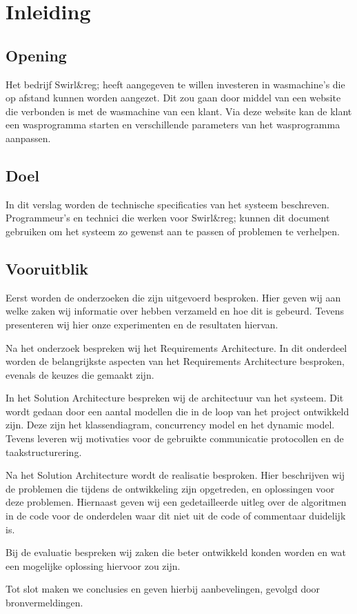 \chapter{Inleiding}
\newpage

\section{Opening}
Het bedrijf Swirl&reg; heeft aangegeven te willen investeren in wasmachine's die op afstand kunnen worden aangezet.
Dit zou gaan door middel van een website die verbonden is met de wasmachine van een klant. Via deze website kan de klant een wasprogramma starten en verschillende parameters van het wasprogramma aanpassen.

\section{Doel}
In dit verslag worden de technische specificaties van het systeem beschreven.
Programmeur's en technici die werken voor Swirl&reg; kunnen dit document gebruiken om het systeem zo gewenst aan te passen of problemen te verhelpen.

\section{Vooruitblik}
Eerst worden de onderzoeken die zijn uitgevoerd besproken.
Hier geven wij aan welke zaken wij informatie over hebben verzameld en hoe dit is gebeurd. Tevens presenteren wij hier onze experimenten en de resultaten hiervan.

Na het onderzoek bespreken wij het Requirements Architecture. In dit onderdeel worden de belangrijkste aspecten van het Requirements Architecture besproken, evenals de keuzes die gemaakt zijn.

In het Solution Architecture bespreken wij de architectuur van het systeem. Dit wordt gedaan door een aantal modellen die in de loop van het project ontwikkeld zijn. Deze zijn het klassendiagram, concurrency model en het dynamic model.
Tevens leveren wij motivaties voor de gebruikte communicatie protocollen en de taakstructurering.

Na het Solution Architecture wordt de realisatie besproken. Hier beschrijven wij de problemen die tijdens de ontwikkeling zijn opgetreden, en oplossingen voor deze problemen.
Hiernaast geven wij een gedetailleerde uitleg over de algoritmen in de code voor de onderdelen waar dit niet uit de code of commentaar duidelijk is.

Bij de evaluatie bespreken wij zaken die beter ontwikkeld konden worden en wat een mogelijke oplossing hiervoor zou zijn.

Tot slot maken we conclusies en geven hierbij aanbevelingen, gevolgd door bronvermeldingen.
